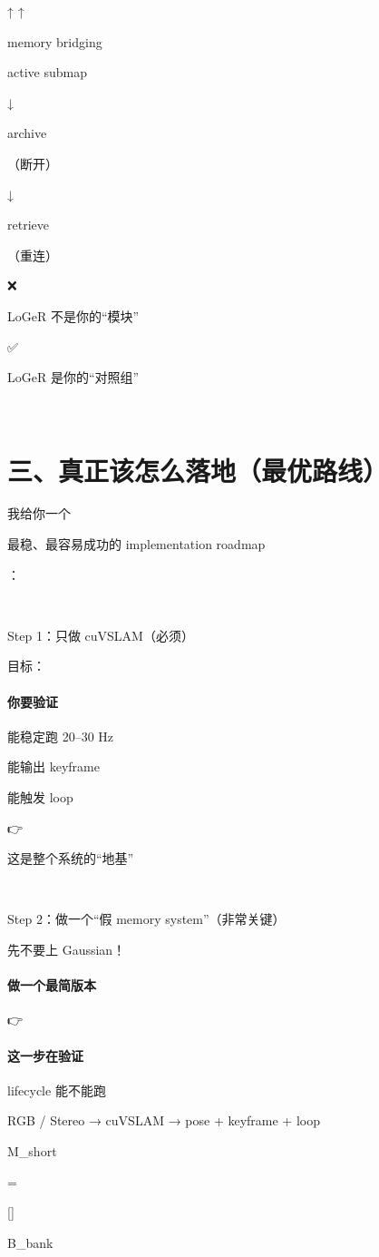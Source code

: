 \documentclass[12pt]{article}
\begin{document}
↑ ↑

memory bridging

active submap

↓

archive

（断开）

↓

retrieve

（重连）

❌

LoGeR 不是你的“模块”

✅

LoGeR 是你的“对照组”

🧩

\section{三、真正该怎么落地（最优路线）}
我给你一个

最稳、最容易成功的 implementation roadmap

：

🥇

Step 1：只做 cuVSLAM（必须）

目标：

\paragraph{你要验证}
能稳定跑 20–30 Hz

能输出 keyframe

能触发 loop

👉

这是整个系统的“地基”

🥈

Step 2：做一个“假 memory system”（非常关键）

先不要上 Gaussian！

\paragraph{做一个最简版本}
👉

\paragraph{这一步在验证}
lifecycle 能不能跑

RGB / Stereo → cuVSLAM → pose + keyframe + loop

M\_short

=

[]

B\_bank
\end{document}
